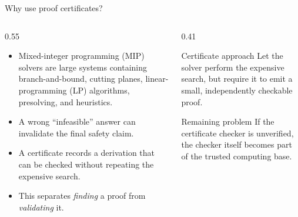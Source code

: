 \documentclass[aspectratio=169,11pt]{beamer}
\begin{document}
\begin{frame}{Why use proof certificates?}
  \begin{columns}[T]
    \begin{column}{0.55\textwidth}
      \begin{itemize}
        \item Mixed-integer programming (MIP) solvers are large systems containing
              branch-and-bound, cutting planes, linear-programming (LP) algorithms,
              presolving, and heuristics.
        \item A wrong ``infeasible'' answer can invalidate the final safety claim.
        \item A certificate records a derivation that can be checked without
              repeating the expensive search.
        \item This separates \emph{finding} a proof from \emph{validating} it.
      \end{itemize}
    \end{column}
    \begin{column}{0.41\textwidth}
      \begin{block}{Certificate approach}
        Let the solver perform the expensive search, but require it to emit a
        small, independently checkable proof.
      \end{block}
      \vspace{0.5em}
      \begin{alertblock}{Remaining problem}
        If the certificate checker is unverified, the checker itself becomes
        part of the trusted computing base.
      \end{alertblock}
    \end{column}
  \end{columns}
\end{frame}
\end{document}
